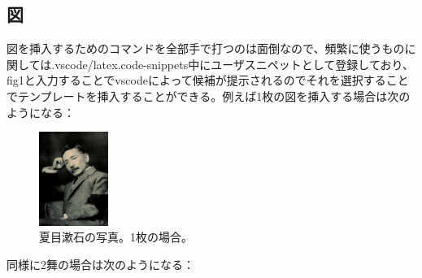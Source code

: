 \documentclass[uplatex]{jsarticle}
\begin{document}
\subsection{図}
図を挿入するためのコマンドを全部手で打つのは面倒なので、頻繁に使うものに関しては.vscode/latex.code-snippets中にユーザスニペットとして登録しており、fig1と入力することでvscodeによって候補が提示されるのでそれを選択することでテンプレートを挿入することができる。例えば1枚の図を挿入する場合は次のようになる：
\begin{figure}[H]
	\centering
	\includegraphics[width=0.2\textwidth]{figure/natsume_soseki.jpeg}
	\caption{夏目漱石の写真\cite{Soseki1905}。1枚の場合。}
	\label{fig:夏目漱石の写真}
\end{figure}
同様に2舞の場合は次のようになる：
\end{document}
